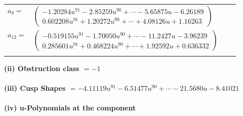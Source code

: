 \documentclass[1p]{elsarticle_modified}
\theoremstyle{definition}
\begin{document}
\begin{tabular}{m{7pt} m{180pt} m{7pt} m{180pt} }
\flushright $a_{8}=$&$\begin{pmatrix}-1.20284 u^{91}-2.85259 u^{90}+\cdots-5.65875 u-6.26189\\0.602208 u^{91}+1.20272 u^{90}+\cdots+4.08126 u+1.16263\end{pmatrix}$ \\
\flushright $a_{12}=$&$\begin{pmatrix}-0.519155 u^{91}-1.70050 u^{90}+\cdots-11.2427 u-3.96239\\0.285601 u^{91}+0.468224 u^{90}+\cdots+1.92592 u+0.636332\end{pmatrix}$\\&\end{tabular}
\flushleft \textbf{(ii) Obstruction class $= -1$}\\~\\
\flushleft \textbf{(iii) Cusp Shapes $= -4.11119 u^{91}-6.51477 u^{90}+\cdots-21.5680 u-8.41021$}\\~\\
\newpage\renewcommand{\arraystretch}{1}
\flushleft \textbf{(iv) u-Polynomials at the component}\newline \\
\end{document}
